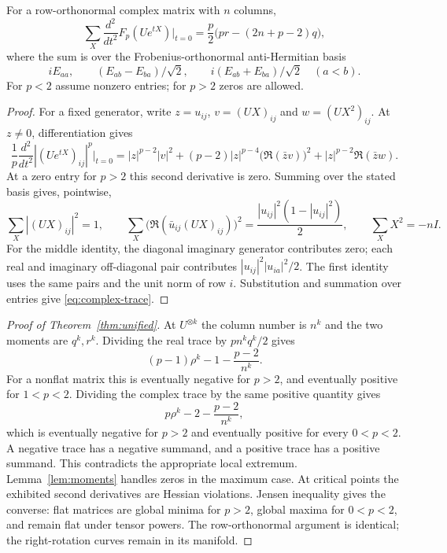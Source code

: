 \begin{lemma}\label{lem:complex-trace}
For a row-orthonormal complex matrix with $n$ columns,
\begin{equation}\label{eq:complex-trace}
 \sum_X\frac{d^2}{dt^2}F_p(Ue^{tX})\bigg|_{t=0}
 =\frac p2\big(pr-(2n+p-2)q\big),
\end{equation}
where the sum is over the Frobenius-orthonormal anti-Hermitian basis
\[
 iE_{aa},\qquad (E_{ab}-E_{ba})/\sqrt2,\qquad
 i(E_{ab}+E_{ba})/\sqrt2\quad(a<b).
\]
For $p<2$ assume nonzero entries; for $p>2$ zeros are allowed.
\end{lemma}
\begin{proof}
For a fixed generator, write $z=u_{ij}$, $v=(UX)_{ij}$ and
$w=(UX^2)_{ij}$. At $z\ne0$, differentiation gives
\[
 \frac1p\frac{d^2}{dt^2}|(Ue^{tX})_{ij}|^p\bigg|_{t=0}
 =|z|^{p-2}|v|^2+(p-2)|z|^{p-4}
       \big(\Re(\bar zv)\big)^2+|z|^{p-2}\Re(\bar zw).
\]
At a zero entry for $p>2$ this second derivative is zero.
Summing over the stated basis gives, pointwise,
\[
 \sum_X |(UX)_{ij}|^2=1,\qquad
 \sum_X\big(\Re(\bar u_{ij}(UX)_{ij})\big)^2
       =\frac{|u_{ij}|^2(1-|u_{ij}|^2)}2,
 \qquad \sum_X X^2=-nI.
\]
For the middle identity, the diagonal imaginary generator contributes
zero; each real and imaginary off-diagonal pair contributes
$|u_{ij}|^2|u_{ia}|^2/2$. The first identity uses the same pairs and
the unit norm of row $i$. Substitution and summation over entries
give \eqref{eq:complex-trace}.
\end{proof}

\begin{proof}[Proof of Theorem~\ref{thm:unified}]
At $U^{\otimes k}$ the column number is $n^k$ and the two moments are
$q^k,r^k$. Dividing the real trace by $pn^kq^k/2$ gives
\[
 (p-1)\rho^k-1-\frac{p-2}{n^k}.
\]
For a nonflat matrix this is eventually negative for $p>2$, and
eventually positive for $1<p<2$. Dividing the complex trace by the
same positive quantity gives
\[
 p\rho^k-2-\frac{p-2}{n^k},
\]
which is eventually negative for $p>2$ and eventually positive for
every $0<p<2$. A negative trace has a negative summand, and a positive
trace has a positive summand. This contradicts the appropriate local
extremum. Lemma~\ref{lem:moments} handles zeros in the maximum case.
At critical points the exhibited second derivatives are Hessian
violations. Jensen inequality gives the converse: flat matrices are
global minima for $p>2$, global maxima for $0<p<2$, and remain flat
under tensor powers. The row-orthonormal argument is identical; the
right-rotation curves remain in its manifold.
\end{proof}

